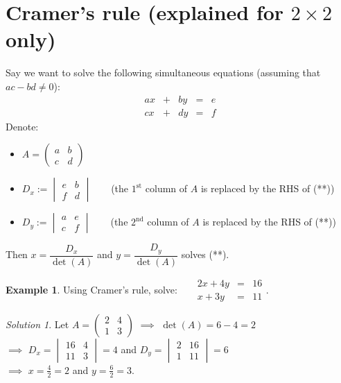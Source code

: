 \documentclass[
  12pt,
  oneside]{book}
\providecommand{\tightlist}{%
  \setlength{\itemsep}{0pt}\setlength{\parskip}{0pt}}
\theoremstyle{definition}
\theoremstyle{definition}
\newtheorem{example}{Example}[chapter]
\theoremstyle{definition}
\theoremstyle{definition}
\theoremstyle{remark}
\newtheorem*{solution}{Solution}
\begin{document}
\hypertarget{cramers-rule-explained-for-2times-2-only}{%
\section{\texorpdfstring{Cramer's rule (explained for \(2\times 2\) only)}{Cramer's rule (explained for 2\textbackslash times 2 only)}}\label{cramers-rule-explained-for-2times-2-only}}

Say we want to solve the following simultaneous equations (assuming that \(ac-bd\not=0\)):
\begin{equation}
\begin{matrix} ax&+&by&=&e\\ cx&+&dy&=&f\end{matrix}
\tag{\(\ast\ast\)}
\end{equation}
Denote:

\begin{itemize}
\tightlist
\item
  \(A=\begin{pmatrix}a&b\\ c&d\end{pmatrix}\)
\item
  \(D_x := \begin{vmatrix}e&b\\f&d\end{vmatrix}\) ~ ~ (the \(1^\text{st}\) column of \(A\) is replaced by the RHS of (**))
\item
  \(D_y := \begin{vmatrix}a&e\\c&f\end{vmatrix}\) ~ ~ (the \(2^\text{nd}\) column of \(A\) is replaced by the RHS of (**))
\end{itemize}

Then \(x=\dfrac{D_x}{\det(A)}\) and \(y=\dfrac{D_y}{\det(A)}\) solves (**).

\begin{example}
Using Cramer's rule, solve:
~~ \(\begin{matrix}2x+4y &=& 16\\ x+3y &=& 11\end{matrix}\).
\end{example}

\begin{solution}
Let \(A=\begin{pmatrix}2&4\\1&3\end{pmatrix}\) \(\implies\) \(\det(A)=6-4=2\)\\
\(\implies\) \(D_x=\begin{vmatrix}16&4\\11&3\end{vmatrix}=4\) and \(D_y=\begin{vmatrix}2&16\\1&11\end{vmatrix}=6\)\\
\(\implies\) \(x=\frac{4}{2}=2\) and \(y=\frac{6}{2}=3\).
\end{solution}
\end{document}
